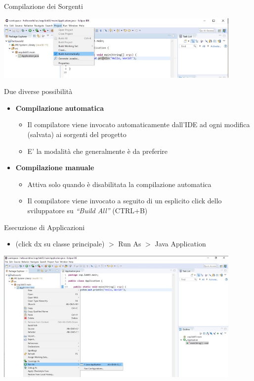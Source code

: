 \documentclass[presentation]{beamer}
\begin{document}
\begin{frame}{Compilazione dei Sorgenti}
\begin{center}
\includegraphics[width=0.9\textwidth]{img/eclipse-screenshots/eclipse-ide-04a.jpg}
\end{center}
\begin{block}{Due diverse possibilità}
\begin{itemize}
\item \textbf{Compilazione automatica}
\begin{itemize}
\item Il compilatore viene invocato automaticamente dall'IDE ad ogni modifica (salvata) ai sorgenti del progetto
\item E' la modalità che generalmente è da preferire
\end{itemize}
\item \textbf{Compilazione manuale}
\begin{itemize}
\item Attiva solo quando è disabilitata la compilazione automatica
\item Il compilatore viene invocato a seguito di un esplicito click dello sviluppatore su \textit{``Build All''} (CTRL+B)
\end{itemize}
\end{itemize}
\end{block}
\end{frame}

\begin{frame}{Esecuzione di Applicazioni}
\begin{itemize}
\item (click dx su classe principale) $>$ Run As $>$ Java Application
\end{itemize}
\begin{center}
\includegraphics[width=0.9\textwidth]{img/eclipse-screenshots/eclipse-ide-04b.jpg}
\end{center}
\end{frame}
\end{document}
